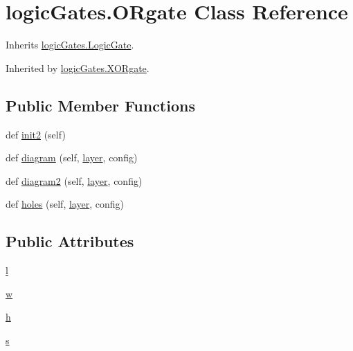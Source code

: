 \hypertarget{classlogic_gates_1_1_o_rgate}{}\section{logic\+Gates.\+O\+Rgate Class Reference}
\label{classlogic_gates_1_1_o_rgate}


Inherits \hyperlink{classlogic_gates_1_1_logic_gate}{logic\+Gates.\+Logic\+Gate}.



Inherited by \hyperlink{classlogic_gates_1_1_x_o_rgate}{logic\+Gates.\+X\+O\+Rgate}.

\subsection*{Public Member Functions}
\begin{DoxyCompactItemize}
\item 
def \hyperlink{classlogic_gates_1_1_o_rgate_a34dc994a956b79c631ab4991fe39b640}{init2} (self)
\item 
def \hyperlink{classlogic_gates_1_1_o_rgate_a6efef0b970d48fc122f45dd3dcb97c8a}{diagram} (self, \hyperlink{classpath_1_1_part_aa1d9912dfa1d7e3222df898d2a18786f}{layer}, config)
\item 
def \hyperlink{classlogic_gates_1_1_o_rgate_aebfea01916ff6cffe2a615264c2c310a}{diagram2} (self, \hyperlink{classpath_1_1_part_aa1d9912dfa1d7e3222df898d2a18786f}{layer}, config)
\item 
def \hyperlink{classlogic_gates_1_1_o_rgate_a143d1cbdb02208d7befb7711fe6d7cc6}{holes} (self, \hyperlink{classpath_1_1_part_aa1d9912dfa1d7e3222df898d2a18786f}{layer}, config)
\end{DoxyCompactItemize}
\subsection*{Public Attributes}
\begin{DoxyCompactItemize}
\item 
\hyperlink{classlogic_gates_1_1_o_rgate_a10cd1ca58ed2efef1b4ad53873f49c91}{l}
\item 
\hyperlink{classlogic_gates_1_1_o_rgate_a2a9cf8819b881ab774218bac01fe536e}{w}
\item 
\hyperlink{classlogic_gates_1_1_o_rgate_a7221b928423b4f7810424e688048b9ed}{h}
\item 
\hyperlink{classlogic_gates_1_1_o_rgate_affc3c9cf483a216c8dfc1ee743482b69}{s}
\end{DoxyCompactItemize}


